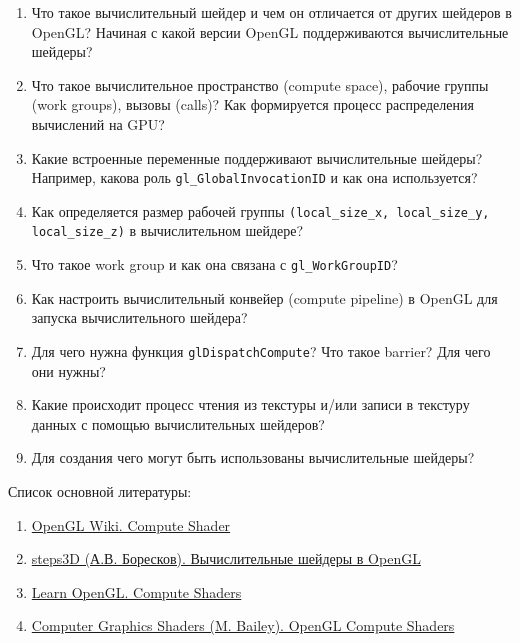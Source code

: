 \documentclass[a4paper,12pt]{article}
\begin{document}
    \begin{enumerate}
        \item Что такое вычислительный шейдер и чем он отличается от других шейдеров в OpenGL? Начиная с какой версии OpenGL поддерживаются вычислительные шейдеры?
        
        \item Что такое вычислительное пространство (compute space), рабочие группы (work groups), вызовы (calls)? Как формируется процесс распределения вычислений на GPU?
        
        \item Какие встроенные переменные поддерживают вычислительные шейдеры? Например, какова роль \texttt{gl\_GlobalInvocationID} и как она используется?
        \item Как определяется размер рабочей группы \texttt{(local\_size\_x, local\_size\_y, local\_size\_z)} в вычислительном шейдере?
        \item Что такое work group и как она связана с \texttt{gl\_WorkGroupID}?
        
        \item Как настроить вычислительный конвейер (compute pipeline) в OpenGL для запуска вычислительного шейдера?
        \item Для чего нужна функция \texttt{glDispatchCompute}? Что такое barrier? Для чего они нужны?
        
        \item Какие происходит процесс чтения из текстуры и/или записи в текстуру данных с помощью вычислительных шейдеров?
        
        \item Для создания чего могут быть использованы вычислительные шейдеры?
    \end{enumerate}
    
    Список основной литературы:
    \begin{enumerate}
        \item \href{https://www.khronos.org/opengl/wiki/Compute_Shader}{OpenGL Wiki. Compute Shader}
        \item \href{https://steps3d.narod.ru/tutorials/compute-shaders-tutorial.html}{steps3D (А.В. Боресков). Вычислительные шейдеры в OpenGL}
        \item \href{https://learnopengl.com/Guest-Articles/2022/Compute-Shaders/Introduction}{Learn OpenGL. Compute Shaders}
        \item \href{https://web.engr.oregonstate.edu/~mjb/cs557/Handouts/compute.shader.1pp.pdf}{Computer Graphics Shaders (M. Bailey). OpenGL Compute Shaders}
    \end{enumerate}
\end{document}
